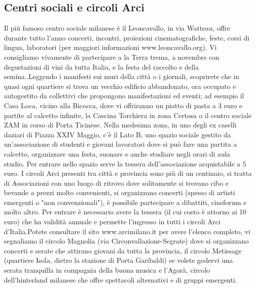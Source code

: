 \subsection{Centri sociali e circoli Arci}
Il più famoso centro sociale milanese è il Leoncavallo, in via Watteau, offre durante tutto l'anno concerti, incontri, proiezioni cinematografiche, feste, corsi di lingua, laboratori (per maggiori informazioni www.leoncavallo.org). Vi consigliamo vivamente di partecipare a la Terra trema, a novembre con degustazioni di vini da tutta Italia, e la festa del raccolto e della semina..Leggendo i manifesti sui muri della città o i giornali, scoprirete che in quasi ogni quartiere si trova un vecchio edificio abbandonato, ora occupato e autogestito da collettivi che propongono manifestazioni ed eventi; ad esempio il Casa Loca, vicino alla Bicocca, dove vi offriranno un piatto di pasta a 3 euro e partite al calcetto infinite, la Cascina Torchiera in zona Certosa o il centro sociale ZAM in corso di Porta Ticinese. Nella medesima zona, in uno degli ex caselli daziari di Piazza XXIV Maggio, c'è il Lato B, uno spazio sociale gestito da un'associazione di studenti e giovani lavoratori dove si può fare una partita a calcetto, organizzare una festa, suonare e anche studiare negli orari di aula studio. Per entrare nello spazio serve la tessera dell'associazione acquistabile a 5 euro.
I circoli Arci presenti tra città e provincia sono più di un centinaio, si tratta di Associazioni con uno luogo di ritrovo dove solitamente si trovano cibo e bevande a prezzi molto convenienti, si organizzano concerti (spesso di artisti emergenti o "non convenzionali"), è possibile partecipare a dibattiti, cineforum e molto altro. 
Per entrare è necessario avere la tessera (il cui costo è attorno ai 10 euro) che ha validità annuale e permette l'ingresso in tutti i circoli Arci d'Italia.Potete consultare il sito www.arcimilano.it per avere l'elenco completo, vi segnaliamo il circolo Magnolia (via Circonvallazione-Segrate) dove si organizzano concerti e serate che attirano giovani da tutta la provincia, il circolo Metissage (quartiere Isola, dietro la stazione di Porta Garibaldi) se volete godervi una serata tranquilla in compagnia della buona musica e l'Agorà, circolo dell'hinterland milanese che offre spettacoli alternativi e di gruppi emergenti.  

